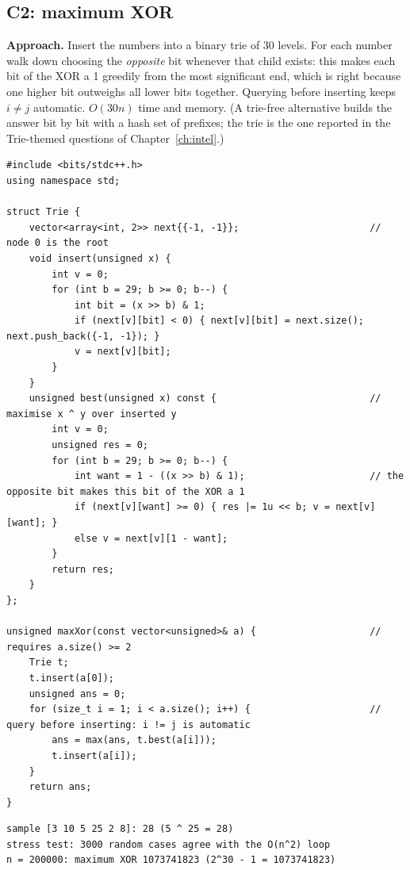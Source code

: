 \documentclass[10pt,a4paper,openany,oneside]{report}
\begin{document}
\subsection{C2: maximum XOR}
\textbf{Approach.} Insert the numbers into a binary trie of 30 levels. For each number walk down choosing the \emph{opposite} bit whenever that child exists: this makes each bit of the XOR a 1 greedily from the most significant end, which is right because one higher bit outweighs all lower bits together. Querying before inserting keeps $i\ne j$ automatic. $O(30n)$ time and memory. (A trie-free alternative builds the answer bit by bit with a hash set of prefixes; the trie is the one reported in the Trie-themed questions of Chapter~\ref{ch:intel}.)
\begin{lstlisting}[language={[11]C++},basicstyle=\ttfamily\fontsize{7.2}{8.6}\selectfont,title={C2 solution (C++)}]
#include <bits/stdc++.h>
using namespace std;

struct Trie {
    vector<array<int, 2>> next{{-1, -1}};                       // node 0 is the root
    void insert(unsigned x) {
        int v = 0;
        for (int b = 29; b >= 0; b--) {
            int bit = (x >> b) & 1;
            if (next[v][bit] < 0) { next[v][bit] = next.size(); next.push_back({-1, -1}); }
            v = next[v][bit];
        }
    }
    unsigned best(unsigned x) const {                           // maximise x ^ y over inserted y
        int v = 0;
        unsigned res = 0;
        for (int b = 29; b >= 0; b--) {
            int want = 1 - ((x >> b) & 1);                      // the opposite bit makes this bit of the XOR a 1
            if (next[v][want] >= 0) { res |= 1u << b; v = next[v][want]; }
            else v = next[v][1 - want];
        }
        return res;
    }
};

unsigned maxXor(const vector<unsigned>& a) {                    // requires a.size() >= 2
    Trie t;
    t.insert(a[0]);
    unsigned ans = 0;
    for (size_t i = 1; i < a.size(); i++) {                     // query before inserting: i != j is automatic
        ans = max(ans, t.best(a[i]));
        t.insert(a[i]);
    }
    return ans;
}
\end{lstlisting}
\begin{lstlisting}[style=out,basicstyle=\ttfamily\fontsize{7.2}{8.6}\selectfont,title={C2: sample, stress test against the O(n\^{}2) loop, maximum size}]
sample [3 10 5 25 2 8]: 28 (5 ^ 25 = 28)
stress test: 3000 random cases agree with the O(n^2) loop
n = 200000: maximum XOR 1073741823 (2^30 - 1 = 1073741823)
\end{lstlisting}
\end{document}
